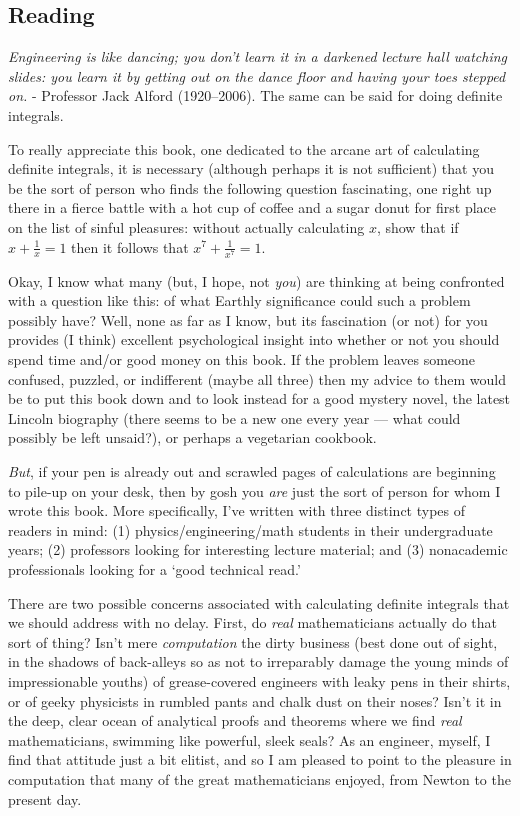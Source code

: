 


\subsection*{Reading}
\begin{center}
  \textit{Engineering is like dancing; you don’t learn it in a darkened lecture hall watching slides: you learn it by getting out on the dance floor and having your toes stepped on.} - Professor Jack Alford (1920–2006). The same can be said for doing definite integrals.
\end{center}

To really appreciate this book, one dedicated to the arcane art of calculating
definite integrals, it is necessary (although perhaps it is not sufficient) that you be
the sort of person who finds the following question fascinating, one right up there in
a fierce battle with a hot cup of coffee and a sugar donut for first place on the list of
sinful pleasures: without actually calculating $x$, show that if $ x + \frac{1}{x} = 1 $
then it follows that $ x^7 + \frac{1}{x^7} = 1 $.

Okay, I know what many (but, I hope, not \textit{you}) are thinking at being confronted
with a question like this: of what Earthly significance could such a problem possibly
have? Well, none as far as I know, but its fascination (or not) for
you provides (I think) excellent psychological insight into whether or not
you should spend time and/or good money on this book. If the problem leaves someone confused, puzzled,
or indifferent (maybe all three) then my advice to them would be to put this book
down and to look instead for a good mystery novel, the latest Lincoln biography
(there seems to be a new one every year --- what could
possibly be left unsaid?), or perhaps a vegetarian cookbook.

\textit{But}, if your pen is already out and scrawled pages of calculations are beginning
to pile-up on your desk, then by gosh you \textit{are} just the sort of person for whom I
wrote this book. More specifically, I’ve written with three distinct types of
readers in mind: (1) physics/engineering/math students in their undergraduate
years; (2) professors looking for interesting lecture material; and (3) nonacademic
professionals looking for a ‘good technical read.’

There are two possible concerns associated with calculating definite integrals
that we should address with no delay. First, do \textit{real} mathematicians actually do that
sort of thing? Isn’t mere \textit{computation }the dirty business (best done out of sight, in
the shadows of back-alleys so as not to irreparably damage the young minds of
impressionable youths) of grease-covered engineers with leaky pens in their shirts,
or of geeky physicists in rumbled pants and chalk dust on their noses? Isn’t it in the
deep, clear ocean of analytical proofs and theorems where we find \textit{real}
mathematicians, swimming like powerful, sleek seals? As an engineer, myself, I find that
attitude just a bit elitist, and so I am pleased to point to the pleasure in computation
that many of the great mathematicians enjoyed, from Newton to the present day.

